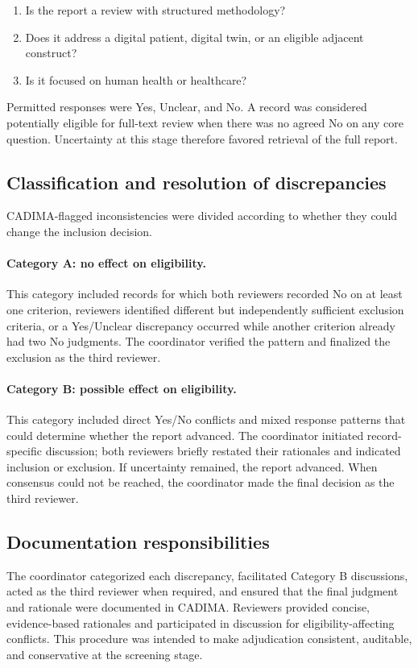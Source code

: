 \begin{enumerate}[leftmargin=*]
    \item Is the report a review with structured methodology?
    \item Does it address a digital patient, digital twin, or an eligible adjacent construct?
    \item Is it focused on human health or healthcare?
\end{enumerate}

Permitted responses were Yes, Unclear, and No. A record was considered potentially eligible for full-text review when there was no agreed No on any core question. Uncertainty at this stage therefore favored retrieval of the full report.

\subsection{Classification and resolution of discrepancies}

CADIMA-flagged inconsistencies were divided according to whether they could change the inclusion decision.

\paragraph{Category A: no effect on eligibility.}
This category included records for which both reviewers recorded No on at least one criterion, reviewers identified different but independently sufficient exclusion criteria, or a Yes/Unclear discrepancy occurred while another criterion already had two No judgments. The coordinator verified the pattern and finalized the exclusion as the third reviewer.

\paragraph{Category B: possible effect on eligibility.}
This category included direct Yes/No conflicts and mixed response patterns that could determine whether the report advanced. The coordinator initiated record-specific discussion; both reviewers briefly restated their rationales and indicated inclusion or exclusion. If uncertainty remained, the report advanced. When consensus could not be reached, the coordinator made the final decision as the third reviewer.

\subsection{Documentation responsibilities}

The coordinator categorized each discrepancy, facilitated Category B discussions, acted as the third reviewer when required, and ensured that the final judgment and rationale were documented in CADIMA. Reviewers provided concise, evidence-based rationales and participated in discussion for eligibility-affecting conflicts. This procedure was intended to make adjudication consistent, auditable, and conservative at the screening stage.
